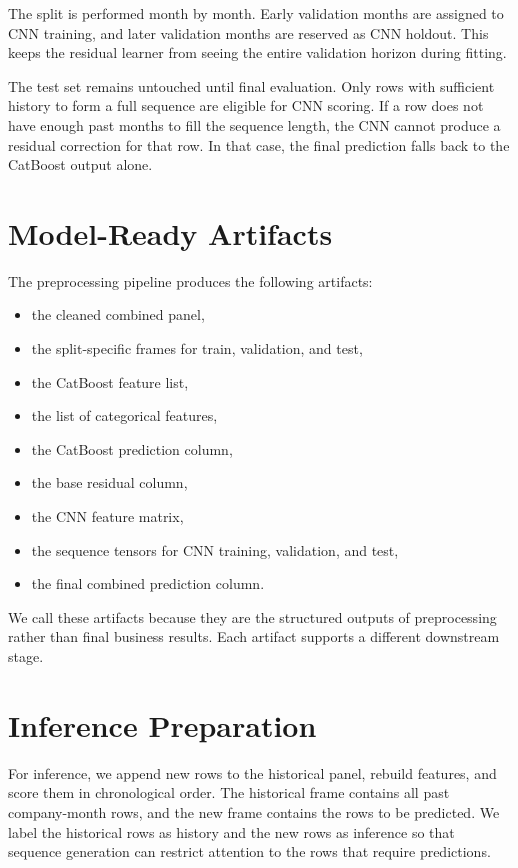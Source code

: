 \documentclass[11pt]{article}
\begin{document}
The split is performed month by month. Early validation months are assigned to CNN training, and later validation months are reserved as CNN holdout. This keeps the residual learner from seeing the entire validation horizon during fitting.

The test set remains untouched until final evaluation. Only rows with sufficient history to form a full sequence are eligible for CNN scoring. If a row does not have enough past months to fill the sequence length, the CNN cannot produce a residual correction for that row. In that case, the final prediction falls back to the CatBoost output alone.

\section{Model-Ready Artifacts}

The preprocessing pipeline produces the following artifacts:
\begin{itemize}
    \item the cleaned combined panel,
    \item the split-specific frames for train, validation, and test,
    \item the CatBoost feature list,
    \item the list of categorical features,
    \item the CatBoost prediction column,
    \item the base residual column,
    \item the CNN feature matrix,
    \item the sequence tensors for CNN training, validation, and test,
    \item the final combined prediction column.
\end{itemize}

We call these artifacts because they are the structured outputs of preprocessing rather than final business results. Each artifact supports a different downstream stage.

\section{Inference Preparation}

For inference, we append new rows to the historical panel, rebuild features, and score them in chronological order. The historical frame contains all past company-month rows, and the new frame contains the rows to be predicted. We label the historical rows as history and the new rows as inference so that sequence generation can restrict attention to the rows that require predictions.
\end{document}
